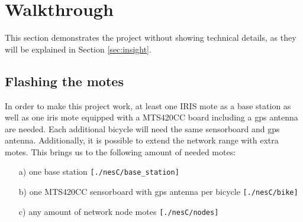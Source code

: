 \documentclass[a4paper]{article}
\begin{document}
\section{Walkthrough}\label{sec:walkthrough}
This section demonstrates the project without showing technical details, as they will be explained in Section \ref{sec:insight}. 
\subsection{Flashing the motes}
In order to make this project work, at least one IRIS mote as a base station as well as one iris mote equipped with a MTS420CC board including a gps antenna are needed. Each additional bicycle will need the same sensorboard and gps antenna. Additionally, it is possible to extend the network range with extra motes. This brings us to the following amount of needed motes:
\begin{enumerate}
\item[a)] one base station \texttt{[./nesC/base\_station]}
\item[b)] one MTS420CC sensorboard with gps antenna per bicycle \texttt{[./nesC/bike]}
\item[c)] any amount of network node motes \texttt{[./nesC/nodes]}
\end{enumerate}
\end{document}
